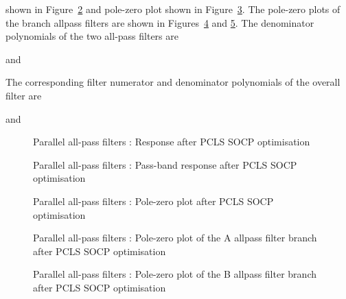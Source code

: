 \documentclass[a4paper,twoside,10pt,english]{report}
\begin{document}
shown in Figure~\ref{fig:Parallel-allpass-filter-PCLS-SOCP-pass-band-response}
and pole-zero plot shown in 
Figure~\ref{fig:Parallel-allpass-filter-PCLS-SOCP-pz}. The pole-zero plots
of the branch allpass filters are shown in 
Figures~\ref{fig:Parallel-allpass-filter-PCLS-SOCP-a1pz} and 
\ref{fig:Parallel-allpass-filter-PCLS-SOCP-b1pz}. 
The denominator polynomials of the two all-pass filters are
\begin{small}

\end{small}
and
\begin{small}

\end{small}
The corresponding filter numerator and denominator polynomials of the overall
filter are
\begin{small}

\end{small}
and
\begin{small}

\end{small}
\begin{figure}[!htbp]
\begin{center}
\scalebox{0.7}{}
\caption{Parallel all-pass filters : Response after PCLS SOCP optimisation}
\label{fig:Parallel-allpass-filter-PCLS-SOCP-response}
\end{center}
\end{figure}
\begin{figure}[!htbp]
\begin{center}
\scalebox{0.7}{}
\caption{Parallel all-pass filters : Pass-band response after PCLS SOCP optimisation}
\label{fig:Parallel-allpass-filter-PCLS-SOCP-pass-band-response}
\end{center}
\end{figure}
\begin{figure}[!htbp]
\begin{center}
\scalebox{0.7}{}
\caption{Parallel all-pass filters : Pole-zero plot after PCLS SOCP optimisation}
\label{fig:Parallel-allpass-filter-PCLS-SOCP-pz}
\end{center}
\end{figure}
\begin{figure}[!htbp]
\begin{center}
\scalebox{0.7}{}
\caption{Parallel all-pass filters : Pole-zero plot of the A allpass filter branch after PCLS SOCP optimisation}
\label{fig:Parallel-allpass-filter-PCLS-SOCP-a1pz}
\end{center}
\end{figure}
\begin{figure}[!htbp]
\begin{center}
\scalebox{0.7}{}
\caption{Parallel all-pass filters : Pole-zero plot of the B allpass filter branch after PCLS SOCP optimisation}
\label{fig:Parallel-allpass-filter-PCLS-SOCP-b1pz}
\end{center}
\end{figure}
\clearpage
\end{document}
